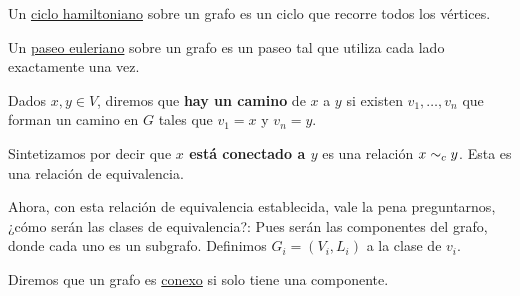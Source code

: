 \begin{defn}
    Un \ul{ciclo hamiltoniano} sobre un grafo es un ciclo que recorre todos los vértices.
\end{defn}

\begin{defn}
    Un \ul{paseo euleriano} sobre un grafo es un paseo tal que utiliza cada lado exactamente una vez.
\end{defn}

\begin{notn}
    Dados $x, y \in V$, diremos que \textbf{hay un camino} de $x$ a $y$ si existen $v_1, \dots, v_n$ que forman un camino en $G$ tales que $v_1 = x$ y $v_n = y$.
    
    Sintetizamos por decir que \textbf{$x$ está conectado a $y$} es una relación $x \sim_{c} y$. Esta es una relación de equivalencia.
\end{notn}

\begin{pre}
    Ahora, con esta relación de equivalencia establecida, vale la pena preguntarnos, ¿cómo serán las clases de equivalencia?: Pues serán las componentes del grafo, donde cada uno es un subgrafo. Definimos $G_i=(V_i,L_i)$ a la clase de $v_i$.
\end{pre}

\begin{defn}
    Diremos que un grafo es \ul{conexo} si solo tiene una componente.
\end{defn}

